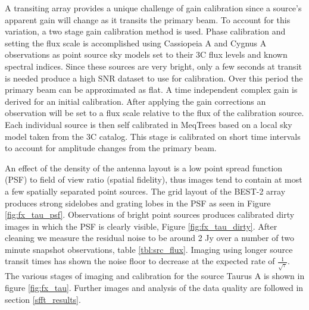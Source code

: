 \documentclass[useAMS,macros,usenatbib,onecolumn]{mn2e}
\begin{document}
A transiting array provides a unique challenge of gain calibration since a source's apparent gain will change as it transits the primary beam.
To account for this variation, a two stage gain calibration method is used.
Phase calibration and setting the flux scale is accomplished using Cassiopeia A and Cygnus A observations as point source sky models set to their 3C flux levels and known spectral indices.
Since these sources are very bright, only a few seconds at transit is needed produce a high SNR dataset to use for calibration.
Over this period the primary beam can be approximated as flat.
A time independent complex gain is derived for an initial calibration.
After applying the gain corrections an observation will be set to a flux scale relative to the flux of the calibration source.
Each individual source is then self calibrated in MeqTrees\citep{meqtrees} based on a local sky model taken from the 3C catalog.
This stage is calibrated on short time intervals to account for amplitude changes from the primary beam.

An effect of the density of the antenna layout is a low point spread function (PSF) to field of view ratio (spatial fidelity), thus images tend to contain at most a few spatially separated point sources.
The grid layout of the BEST-2 array produces strong sidelobes and grating lobes in the PSF as seen in Figure \ref{fig:fx_tau_psf}.
Observations of bright point sources produces calibrated dirty images in which the PSF is clearly visible, Figure \ref{fig:fx_tau_dirty}.
After cleaning we measure the residual noise to be around 2 Jy over a number of two minute snapshot observations, table \ref{tbl:src_flux}.
Imaging using longer source transit times has shown the noise floor to decrease at the expected rate of $\frac{1}{\sqrt{\tau}}$.
The various stages of imaging and calibration for the source Taurus A is shown in figure \ref{fig:fx_tau}.
Further images and analysis of the data quality are followed in section \ref{sfft_results}.
\end{document}
